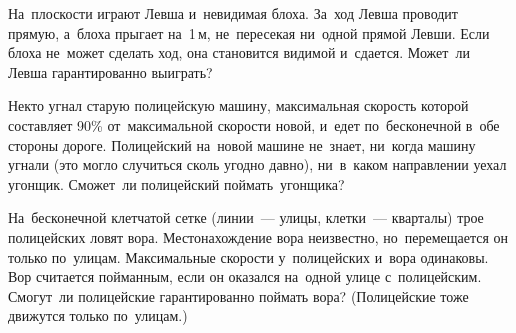 \begin{problems}

\item
На~плоскости играют Левша и~невидимая блоха.
За~ход Левша проводит прямую, а~блоха прыгает на~1\,м, не~пересекая ни~одной
прямой Левши.
Если блоха не~может сделать ход, она становится видимой и~сдается.
Может~ли Левша гарантированно выиграть?

\item
Некто угнал старую полицейскую машину, максимальная скорость которой
составляет 90\% от~максимальной скорости новой, и~едет по~бесконечной в~обе
стороны дороге.
Полицейский на~новой машине не~знает, ни~когда машину угнали (это могло
случиться сколь угодно давно), ни~в~каком направлении уехал угонщик.
Сможет~ли полицейский поймать~угонщика?

\itemx{*}
На~бесконечной клетчатой сетке (линии~--- улицы, клетки~--- кварталы) трое
полицейских ловят вора.
Местонахождение вора неизвестно, но~перемещается он только по~улицам.
Максимальные скорости у~полицейских и~вора одинаковы.
Вор считается пойманным, если он оказался на~одной улице с~полицейским.
Смогут~ли полицейские гарантированно поймать вора?
(Полицейские тоже движутся только по~улицам.)

\end{problems}

